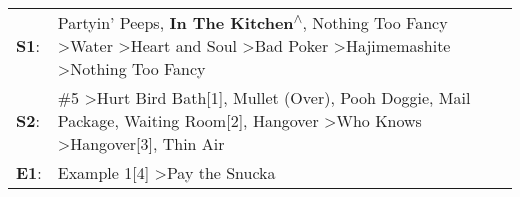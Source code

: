 \begin{supertabular}{p{0.03\textwidth}p{0.92\textwidth}}
 \textbf{S1}:  &                       Partyin' Peeps\textsuperscript{}, \enspace \textbf{In The Kitchen\textsuperscript{$\wedge$}}, \enspace Nothing Too Fancy\textsuperscript{} \textgreater \enspace Water\textsuperscript{} \textgreater \enspace Heart and Soul\textsuperscript{} \textgreater \enspace Bad Poker\textsuperscript{} \textgreater \enspace Hajimemashite\textsuperscript{} \textgreater \enspace Nothing Too Fancy\textsuperscript{}  \enspace  \\
 \textbf{S2}:  &  \#5\textsuperscript{} \textgreater \enspace Hurt Bird Bath[1]\textsuperscript{}, \enspace Mullet (Over)\textsuperscript{}, \enspace Pooh Doggie\textsuperscript{}, \enspace Mail Package\textsuperscript{}, \enspace Waiting Room[2]\textsuperscript{}, \enspace Hangover\textsuperscript{} \textgreater \enspace Who Knows\textsuperscript{} \textgreater \enspace Hangover[3]\textsuperscript{}, \enspace Thin Air\textsuperscript{}  \enspace  \\
 \textbf{E1}:  &                                                                                                                                                                                                                                                                                                                                                   Example 1[4]\textsuperscript{} \textgreater \enspace Pay the Snucka\textsuperscript{}  \enspace  \\
\end{supertabular}
